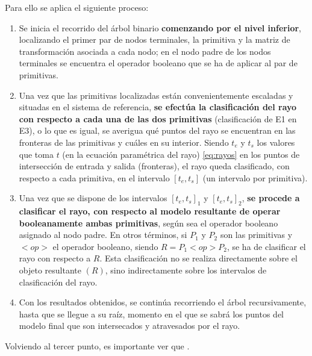 Para ello se aplica el siguiente proceso: 
\begin{enumerate}
    \item Se inicia el recorrido del árbol binario \textbf{comenzando por el nivel inferior}, localizando el primer par de nodos terminales, la primitiva y la matriz de transformación asociada a cada nodo; en el nodo padre de los nodos terminales se encuentra el operador booleano que se ha de aplicar al par de primitivas.
    \item Una vez que las primitivas localizadas están convenientemente escaladas y situadas en el sistema de referencia, \textbf{se efectúa la clasificación del rayo con respecto a cada una de las dos primitivas} (clasificación de E1 en E3), o lo que es igual, se averigua qué puntos del rayo se encuentran en las fronteras de las primitivas y cuáles en su interior. Siendo $t_e$ y $t_s$ los valores que toma $t$ (en la ecuación paramétrica del rayo) \ref{eq:rayos} en los puntos de intersección de entrada y salida (fronteras), el rayo queda clasificado, con respecto a cada primitiva, en el intervalo $[t_e, t_s]$ (un intervalo por primitiva).
    \item Una vez que se dispone de los intervalos ${[t_e, t_s]}_1$ y ${[t_e, t_s]}_2$, \textbf{se procede a clasificar el rayo, con respecto al modelo resultante de operar booleanamente ambas primitivas}, según sea el operador booleano asignado al nodo padre. En otros términos, si $P_1$ y $P_2$ son las primitivas y $<op>$ el operador booleano, siendo $R = P_1 <op> P_2$, se ha de clasificar el rayo con respecto a $R$. Esta clasificación no se realiza directamente sobre el objeto resultante $(R)$, sino indirectamente sobre los intervalos de clasificación del rayo.
    \item Con los resultados obtenidos, se continúa recorriendo el árbol recursivamente, hasta que se llegue a su raíz, momento en el que se sabrá los puntos del modelo final que son intersecados y atravesados por el rayo.
    
\end{enumerate}

 Volviendo al tercer punto, es importante ver que  \citep{Ramos2011}.



